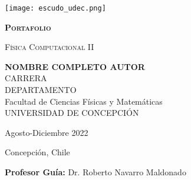 \documentclass[../portafolio.tex]{subfiles}
\begin{document}


\begin{titlepage}
  
  
  \thispagestyle{frontpage}
  
  \begin{center}
    
    \texttt{[image: escudo\_udec.png]}
    
    
    \vspace*{3\baselineskip}

      \textsc{\Huge \textbf{Portafolio}}
      \vspace*{1.5\baselineskip}
      
      \textsc{\huge Física Computacional II}\\ %
      
      \vspace*{4\baselineskip}
      
      \large{\textbf{NOMBRE COMPLETO AUTOR}}\\ 
      
      \large{CARRERA \\
        DEPARTAMENTO \\
        Facultad de Ciencias Físicas y Matemáticas\\
        UNIVERSIDAD DE CONCEPCIÓN}
      
    
    \vspace{4\baselineskip}

    Agosto-Diciembre 2022

    \vspace{0.1\baselineskip}

    Concepción, Chile 

    \vspace{1.5\baselineskip}
    
    \large{\textbf{Profesor Guía:} Dr. Roberto Navarro Maldonado}\\
    
  \end{center}
  
  \vspace*{4\baselineskip}
  
  
\end{titlepage}
\end{document}
